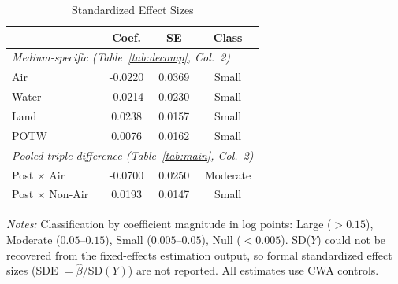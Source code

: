 \begin{table}[htbp]
\centering
\caption{Standardized Effect Sizes}
\label{tab:sde}
\begin{tabular}{lccc}
\toprule
& Coef. & SE & Class \\
\midrule
\multicolumn{4}{l}{\textit{Medium-specific (Table~\ref{tab:decomp}, Col.\ 2)}} \\[3pt]
Air & -0.0220 & 0.0369 & Small \\
Water & -0.0214 & 0.0230 & Small \\
Land & 0.0238 & 0.0157 & Small \\
POTW & 0.0076 & 0.0162 & Small \\[6pt]
\multicolumn{4}{l}{\textit{Pooled triple-difference (Table~\ref{tab:main}, Col.\ 2)}} \\[3pt]
Post $\times$ Air & -0.0700 & 0.0250 & Moderate \\
Post $\times$ Non-Air & 0.0193 & 0.0147 & Small \\
\bottomrule
\end{tabular}
\begin{minipage}{0.95\textwidth}
\vspace{0.3em}
\footnotesize \textit{Notes:} Classification by coefficient magnitude in log points: Large ($>0.15$), Moderate ($0.05$--$0.15$), Small ($0.005$--$0.05$), Null ($<0.005$). SD($Y$) could not be recovered from the fixed-effects estimation output, so formal standardized effect sizes (SDE $= \hat{\beta}/\text{SD}(Y)$) are not reported. All estimates use CWA controls.
\end{minipage}
\end{table}
